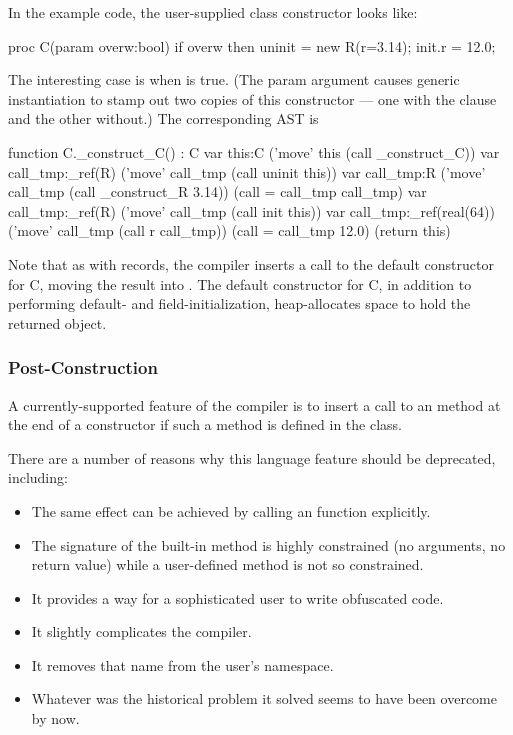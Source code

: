 In the example code, the user-supplied class constructor looks like:
\begin{chapel}
  proc C(param overw:bool)
  {
    if overw then
    {
      uninit = new R(r=3.14);
      init.r = 12.0;
    }
  }
\end{chapel}
The interesting case is when  is true.  (The param argument causes generic
instantiation to stamp out two copies of this constructor --- one with the 
 clause and the other without.)  The corresponding AST is
\begin{chapelcode}
  function C._construct_C() : C
  {
    var this:C
    ('move' this (call _construct_C))
    {
      var call_tmp:_ref(R)
      ('move' call_tmp (call uninit this))
      var call_tmp:R
      ('move' call_tmp (call _construct_R 3.14))
      (call = call_tmp call_tmp)
      var call_tmp:_ref(R)
      ('move' call_tmp (call init this))
      var call_tmp:_ref(real(64))
      ('move' call_tmp (call r call_tmp))
      (call = call_tmp 12.0)
    }
    (return this)
  }
\end{chapelcode}
Note that as with records, the compiler inserts a call to the default constructor for C,
moving the result into .  The default constructor for C, in addition to
performing default- and field-initialization, heap-allocates space to hold the returned object.


\subsubsection{Post-Construction}

A currently-supported feature of the compiler is to insert a call to an 
method at the end of a constructor if such a method is defined in the class.

There are a number of reasons why this language feature should be deprecated, including:
\begin{itemize}
\item The same effect can be achieved by calling an  function explicitly.
\item The signature of the built-in  method is highly constrained (no
  arguments, no return value) while a user-defined  method is not so
  constrained. 
\item It provides a way for a sophisticated user to write obfuscated code.
\item It slightly complicates the compiler.
\item It removes that name from the user's namespace.
\item Whatever was the historical problem it solved seems to have been overcome by now.
\end{itemize}


